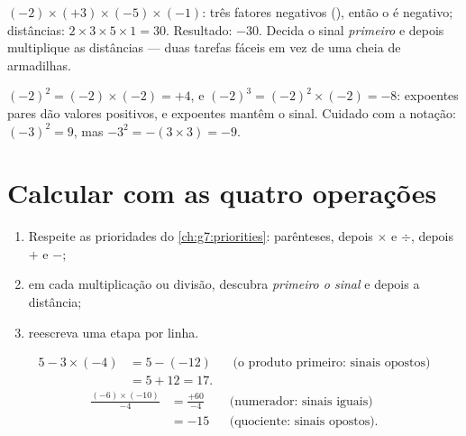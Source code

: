 \begin{example}\label{ex:g8:negprod:many}
$(-2) \times (+3) \times (-5) \times (-1)$: três fatores negativos
(), então o  é negativo; distâncias:
$2 \times 3 \times 5 \times 1 = 30$. Resultado: $-30$. Decida o sinal
\emph{primeiro} e depois multiplique as distâncias --- duas tarefas
fáceis em vez de uma cheia de armadilhas.
\end{example}

\begin{example}\label{ex:g8:negprod:powers}
$(-2)^2 = (-2) \times (-2) = +4$, e
$(-2)^3 = (-2)^2 \times (-2) = -8$: expoentes pares dão valores
positivos, e expoentes  mantêm o sinal. Cuidado com a notação:
$(-3)^2 = 9$, mas $-3^2 = -(3 \times 3) = -9$.
\end{example}

\section{Calcular com as quatro operações}

\begin{method}\label{met:g8:negprod:compute}
\begin{enumerate}
  \item Respeite as prioridades do \cref{ch:g7:priorities}: parênteses,
        depois $\times$ e $\div$, depois $+$ e $-$;
  \item em cada multiplicação ou divisão, descubra \emph{primeiro o
        sinal} e depois a distância;
  \item reescreva uma etapa por linha.
\end{enumerate}
\end{method}

\begin{example}\label{ex:g8:negprod:compute}
\begin{align*}
5 - 3 \times (-4)
&= 5 - (-12) && \text{(o produto primeiro: sinais opostos)}\\
&= 5 + 12 = 17 .
\end{align*}
\begin{align*}
\frac{(-6) \times (-10)}{-4}
&= \frac{+60}{-4} && \text{(numerador: sinais iguais)}\\
&= -15 && \text{(quociente: sinais opostos).}
\end{align*}
\end{example}

